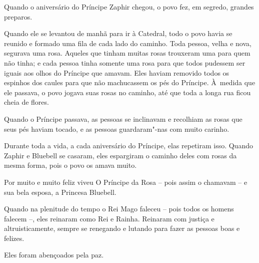 
Quando o aniversário do Príncipe Zaphir chegou, o povo fez, em segredo,
grandes preparos.

Quando ele se levantou de manhã para ir à Catedral, todo o povo havia se
reunido e formado uma fila de cada lado do caminho. Toda pessoa, velha e
nova, segurava uma rosa. Aqueles que tinham muitas rosas trouxeram uma
para quem não tinha; e cada pessoa tinha somente uma rosa para que todos
pudessem ser iguais aos olhos do Príncipe que amavam. Eles haviam
removido todos os espinhos dos caules para que não machucassem os pés do
Príncipe. À~medida que ele passava, o povo jogava suas rosas no caminho,
até que toda a longa rua ficou cheia de flores.

Quando o Príncipe passava, as pessoas se inclinavam e recolhiam as rosas
que seus pés haviam tocado, e as pessoas guardaram"-nas com muito
carinho.

Durante toda a vida, a cada aniversário do Príncipe, elas repetiram isso.
Quando Zaphir e Bluebell se casaram, eles espargiram o caminho deles com
rosas da mesma forma, pois o povo os amava muito.

Por muito e muito feliz viveu O Príncipe da Rosa -- pois assim o
chamavam -- e sua bela esposa, a Princesa Bluebell.

Quando na plenitude do tempo o Rei Mago faleceu -- pois todos os homens
falecem --, eles reinaram como Rei e Rainha. Reinaram com justiça e
altruisticamente, sempre se renegando e lutando para fazer as pessoas
boas e felizes.

Eles foram abençoados pela paz.

